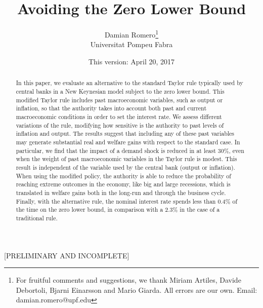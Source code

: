 \documentclass[11pt]{article}
\title{Avoiding the Zero Lower Bound}
\author{Damian Romero\thanks{For fruitful comments and suggestions, we thank Miriam Artiles, Davide Debortoli, Bjarni Einarsson and Mario Giarda. All errors are our own. Email: damian.romero@upf.edu}\\Universitat Pompeu Fabra}
\date{This version: April 20, 2017}
\numberwithin{equation}{section}
\begin{document}
	
\maketitle

\vspace{-0.7cm}

\begin{center}
	[PRELIMINARY AND INCOMPLETE]
\end{center}

\begin{abstract}
\noindent In this paper, we evaluate an alternative to the standard Taylor rule typically used by central banks in a New Keynesian model subject to the zero lower bound. This modified Taylor rule includes past macroeconomic variables, such as output or inflation, so that the authority takes into account both past and current macroeconomic conditions in order to set the interest rate. We assess different variations of the rule, modifying how sensitive is the authority to past levels of inflation and output. The results suggest that including any of these past variables may generate substantial real and welfare gains with respect to the standard case. In particular, we find that the impact of a demand shock is reduced in at least 30\%, even when the weight of past macroeconomic variables in the Taylor rule is modest. This result is independent of the variable used by the central bank (output or inflation). When using the modified policy, the authority is able to reduce the probability of reaching extreme outcomes in the economy, like big and large recessions, which is translated in welfare gains both in the long-run and through the business cycle. Finally, with the alternative rule, the nominal interest rate spends less than 0.4\% of the time on the zero lower bound, in comparison with a 2.3\% in the case of a traditional rule.
\end{abstract}	
\end{document}
